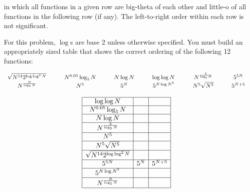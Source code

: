 \documentclass[12pt]{article}
\begin{document}
\begin{enumerate}
{    in which all functions in a given row are big-theta of each other and
    little-o of all functions in the following row (if any). The left-to-right
    order within each row is not significant.
    \bigskip

    For this problem, $\log$s are base 2 unless otherwise specified. You must
    build an  appropriately sized table that shows the correct ordering of the
    following 12 functions:

    \begin{minipage}{\linewidth}
  \center
  \[
    \begin{array}{c@{\hspace*{30pt}}c@{\hspace*{30pt}}c@{\hspace*{30pt}}c@{\hspace*{30pt}}c@{\hspace*{30pt}}c}

      \sqrt{N^{14}2^{\log\log^2 N}}
      &  N^{0.05}\log_5 N
      &    N\log N
      & \log\log N
      &  N^{\frac{5}{\log_5 N}}
       & 5^{5N} \\
      N^{\frac{N}{\log_5 N}}
      & N^5
      & 5^N
      & 5^{N\log N^5}
      & N^5\sqrt{N^5}
      & 5^{N+5}
    \end{array}
    \]
    \end{minipage}
    }
    
    \begin{minipage}{\linewidth}
      \center
      \[
        \begin{array}{|c|c|c|}\hline
          \log\log N       &        & \\\hline
          N^{0.05}\log_5 N &           & \\\hline
          N\log N    &  & \\\hline
          N^{\frac{5}{\log_5 N}}     &           & \\\hline
          N^5       &        & \\\hline
          N^5\sqrt{N^5} &           & \\\hline
          \sqrt{N^{14}2^{\log\log^2 N}}     &  & \\\hline
          5^{5N}     & 5^N          & 5^{N+5} \\\hline
          5^{N\log N^5}     &  & \\\hline
          N^{\frac{N}{\log_5 N}}     &           & \\\hline
        \end{array}
      \]
    \end{minipage}\medskip


\end{enumerate}
\end{document}
